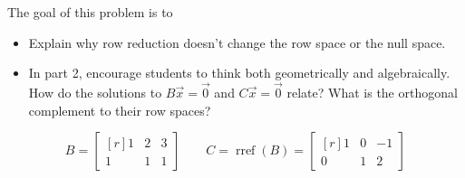 \documentclass{problemset}
\DeclareMathOperator{\Rref}{rref}
\newcommand{\rref}{\Rref}
\newcommand{\mat}[1]{\begin{bmatrix*}[r]#1\end{bmatrix*}}
\begin{document}
	\question
	\begin{annotation}
		\begin{goals}

			The goal of this problem is to
			\begin{itemize}
				\item Explain why row reduction doesn't change the row space or the null space.
			\end{itemize}
		\end{goals}

		\begin{notes}
			\begin{itemize}
				\item In part 2, encourage students to think both geometrically
					and algebraically. How do the solutions to $B\vec x=\vec 0$ and
					$C\vec x=\vec 0$ relate? What is the orthogonal complement to their row
					spaces?
			\end{itemize}
		\end{notes}
	\end{annotation}
	\[
		B=\mat{1&2&3\\1&1&1}\qquad C=\rref(B)=\mat{1&0&-1\\0&1&2}
	\]
\end{document}
